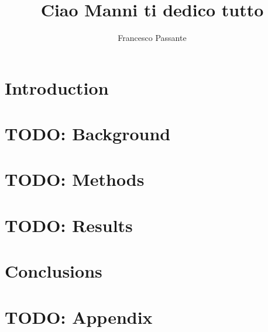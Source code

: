 \documentclass[noexaminfo]{sapthesis}
\title{Ciao Manni ti dedico tutto}
\author{Francesco Passante}
\begin{document}
\frontmatter
\maketitle


\begin{abstract}

\end{abstract}

% 

\tableofcontents

\mainmatter

\chapter{Introduction}
\label{ch:introduction}


\chapter{TODO: Background}
\label{ch:background}


\chapter{TODO: Methods}
\label{ch:methods}


\chapter{TODO: Results}
\label{ch:results}


\chapter{Conclusions}
\label{ch:conclusions}


\appendix
\chapter{TODO: Appendix}
\label{app:appendix_a}


\backmatter
\cleardoublepage
{}
{}
\printbibliography
\end{document}
